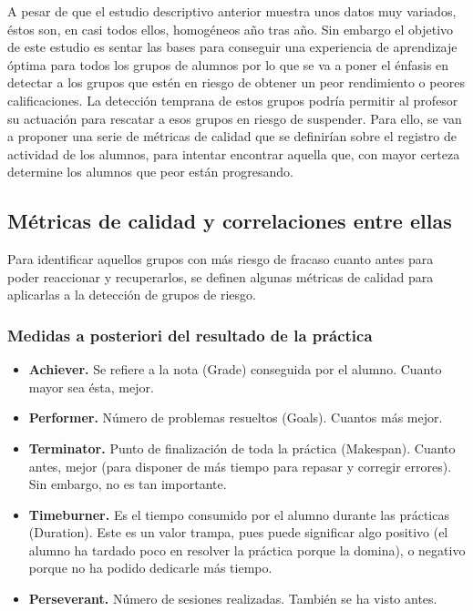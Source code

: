 A pesar de que el estudio descriptivo anterior muestra unos datos muy variados, éstos son, en casi todos ellos, homogéneos año tras año. Sin embargo el objetivo de este estudio es sentar las bases para conseguir una experiencia de aprendizaje óptima para todos los grupos de alumnos por lo que se va a poner el énfasis en detectar a los grupos que estén en riesgo de obtener un peor rendimiento o peores calificaciones. La detección temprana de estos grupos podría permitir al profesor su actuación para rescatar a esos grupos en riesgo de suspender. Para ello, se van a proponer una serie de métricas de calidad que se definirían sobre el registro de actividad de los alumnos, para intentar encontrar aquella que, con mayor certeza determine los alumnos que peor están progresando.

\subsection{Métricas de calidad y correlaciones entre ellas}

Para identificar aquellos grupos con más riesgo de fracaso cuanto antes para poder reaccionar y recuperarlos, se definen algunas métricas de calidad para aplicarlas a la detección de grupos de riesgo.

\subsubsection{Medidas a posteriori del resultado de la práctica}

\begin{itemize}
\item \textbf{Achiever.} Se refiere a la nota (Grade) conseguida por el alumno. Cuanto mayor sea ésta, mejor.
\item \textbf{Performer.} Número de problemas resueltos (Goals). Cuantos más mejor.
\item \textbf{Terminator.} Punto de finalización de toda la práctica (Makespan). Cuanto antes, mejor (para disponer de más tiempo para repasar y corregir errores). Sin embargo, no es tan importante.
\item \textbf{Timeburner.} Es el tiempo consumido por el alumno durante las prácticas (Duration). Este es un valor trampa, pues puede significar algo positivo (el alumno ha tardado poco en resolver la práctica porque la domina), o negativo porque no ha podido dedicarle más tiempo.
\item \textbf{Perseverant.} Número de sesiones realizadas. También se ha visto antes.
\end{itemize}

